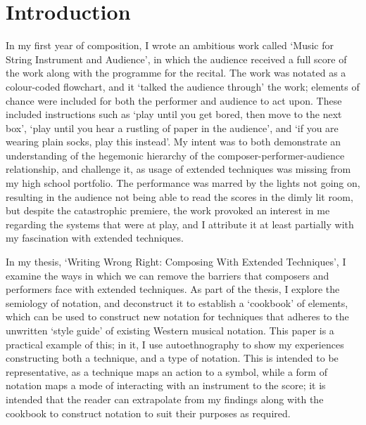 \section{Introduction}


\doublespace{}

In my first year of composition, I wrote an ambitious work called `Music for String Instrument and Audience', in which the audience received a full score of the work along with the programme for the recital.
The work was notated as a colour-coded flowchart, and it `talked the audience through' the work; elements of chance were included for both the performer and audience to act upon.
These included instructions such as `play until you get bored, then move to the next box', `play until you hear a rustling of paper in the audience', and `if you are wearing plain socks, play this instead'.
My intent was to both demonstrate an understanding of the hegemonic hierarchy of the composer-performer-audience relationship, and challenge it, as usage of extended techniques was missing from my high school portfolio.
The performance was marred by the lights not going on, resulting in the audience not being able to read the scores in the dimly lit room, but despite the catastrophic premiere, the work provoked an interest in me regarding the systems that were at play, and I attribute it at least partially with my fascination with extended techniques.

In my thesis, `Writing Wrong Right: Composing With Extended Techniques', I examine the ways in which we can remove the barriers that composers and performers face with extended techniques.
As part of the thesis, I explore the semiology of notation, and deconstruct it to establish a `cookbook' of elements, which can be used to construct new notation for techniques that adheres to the unwritten `style guide' of existing Western musical notation.
This paper is a practical example of this; in it, I use autoethnography to show my experiences constructing both a technique, and a type of notation. 
This is intended to be representative, as a technique maps an action to a symbol, while a form of notation maps a mode of interacting with an instrument to the score;
it is intended that the reader can extrapolate from my findings along with the cookbook to construct notation to suit their purposes as required.
